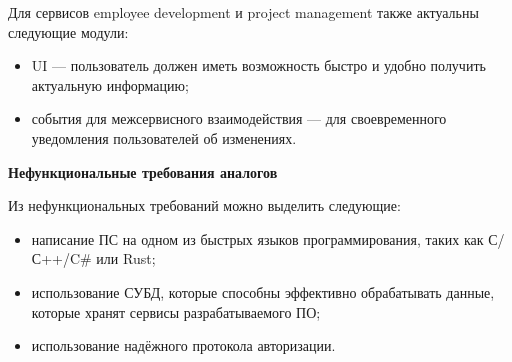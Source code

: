 Для сервисов employee development и project management также актуальны следующие модули:
\begin{itemize}
    \item UI — пользователь должен иметь возможность быстро и удобно получить актуальную информацию;
    \item события для межсервисного взаимодействия — для своевременного уведомления пользователей об изменениях.
\end{itemize}

\textbf{Нефункциональные требования аналогов}

Из нефункциональных требований можно выделить следующие:
\begin{itemize}
    \item написание ПС на одном из быстрых языков программирования, таких как С/С++/C# или Rust;
    \item использование СУБД, которые способны эффективно обрабатывать данные, которые хранят сервисы разрабатываемого ПО;
    \item использование надёжного протокола авторизации.
\end{itemize}
